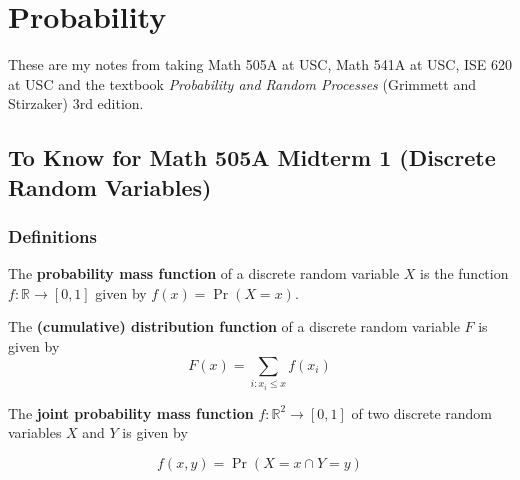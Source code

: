 %
%
%
%
%
%
%
%
%
%
%
%

\section{Probability}

These are my notes from taking Math 505A at USC, Math 541A at USC, ISE 620 at USC and the textbook \textit{Probability and Random Processes} (Grimmett and Stirzaker) 3rd edition.

\subsection{To Know for Math 505A Midterm 1 (Discrete Random Variables)}

\subsubsection{Definitions}

\begin{definition}The \textbf{probability mass function} of a discrete random variable \(X\) is the function \(f: \mathbb{R} \to [0,1]\) given by \(f(x) = \Pr(X = x)\). \end{definition}

\begin{definition}The \textbf{(cumulative) distribution function} of a discrete random variable \(F\) is given by \[F(x) = \sum_{i:x_i \leq x} f(x_i)\] \end{definition}

\begin{definition}The \textbf{joint probability mass function} \(f: \mathbb{R}^2 \to [0, 1]\) of two discrete random variables \(X\) and \(Y\) is given by

\[
f(x, y) = \Pr(X = x \cap Y = y)
\] \end{definition}

